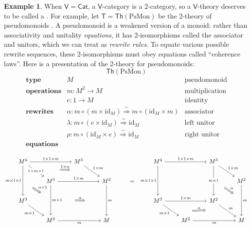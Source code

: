 \documentclass{amsart}
\newcommand{\define}[1]{{\bf \boldmath{#1}}}
\theoremstyle{definition}
\newtheorem{example}[theorem]{Example}
\newcommand{\Th}{\mathsf{Th}}
\newcommand{\Cat}{\mathsf{Cat}}
\newcommand{\V}{\mathsf{V}}
\newcommand{\T}{\mathsf{T}}
\newcommand{\maps}{\colon}
\newcommand{\id}{\mathrm{id}}
\begin{document}
\begin{example}
When $\V = \Cat$, a $\V$-category is a 2-category, so a $\V$-theory deserves to be called a \define{2-theory}.  For example, let $\T = \Th(\mathrm{PsMon})$ be the 2-theory of pseudomonoids \cite{pseudo}.   A pseudomonoid is a weakened version of a monoid: rather than associativity and unitality \textit{equations}, it has 2-isomorphisms called the associator and unitors, which we can treat as \textit{rewrite rules}.  To equate various possible rewrite sequences, these 2-isomorphisms must obey equations called ``coherence laws''.  Here is a presentation of the 2-theory for pseudomonoids:
	\[ \Th(\mathrm{PsMon}) \]
	\[\begin{array}{lll}
	\textbf{type} & M & \text{pseudomonoid}\\
	 \textbf{operations}
	& m\maps M^2 \to M & \text{multiplication}\\
	 & e\maps1 \to M & \text{identity}\\
	\textbf{rewrites} & \alpha \colon m \circ (m \times \id_M) \stackrel{\sim}{\Longrightarrow} m \circ (\id_M \times m) & \text{associator}\\
	& \lambda\maps  m \circ (e \times \id_M) \stackrel{\sim}{\Longrightarrow} \id_M & \text{left unitor}\\
	& \rho\maps m \circ (\id_M \times e) \stackrel{\sim}{\Longrightarrow} \id_M & \text{right unitor}\\
	\textbf{equations}
          \end{array}\]

        \[\begin{tikzcd}
          M^4 \ar[rr,"1\times 1\times m"] \ar[dr,"1\times m\times 1" description, ""name=a1] \ar[dd, "m\times 1\times 1",swap,""name=b1] && M^3 \ar[dr, "1\times m",""name=a2] \arrow[Rightarrow,"1\times \alpha",from=a1,to=a2,shorten >=1.3cm,shorten <=1.3cm] &&& M^4 \ar[rr, "1\times 1\times m"] \ar[dd,"m\times 1\times 1",swap,""name=d1] && M^3 \ar[dd,"m\times 1" description,""name=d2] \ar[dr,"1\times m"] %
          & \\
          & M^3 \ar[rr,"1\times m"] \ar[dd,"m\times 1",""name=b2] \arrow[Rightarrow,"\alpha\times 1",from=b1,to=b2,shorten >=0.7cm,shorten <=0.7cm] && M^2 \ar[dd,"m",""name=c1] & = & &&& M^2 \ar[dd,"m",""name=f1] \arrow[Rightarrow,"\alpha",from=d2,to=f1,shorten >=0.6cm,shorten <=0.6cm] \arrow[Rightarrow,"\alpha",from=b2,to=c1,shorten >=1.3cm,shorten <=1.3cm] \\
          M^3 \ar[dr,"m\times 1",swap] &&& && M^3 \ar[rr,"1\times m"] \ar[dr,"m\times 1",swap,,""name=e1] && M^2 \ar[dr,"m",,""name=e2] \arrow[Rightarrow,"\alpha",from=e1,to=e2,shorten >=1.3cm,shorten <=1.3cm] & \\
          & M^2 \ar[rr,"m",swap] && M && & M^2 \ar[rr,"m",swap] && M
        \end{tikzcd}\]


\end{example}
\end{document}
